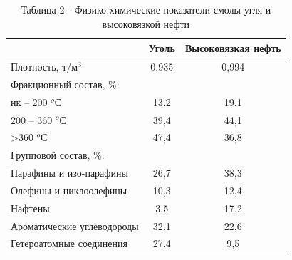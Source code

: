 \begin{table}[H]
\caption*{Таблица 2 - Физико-химические показатели смолы угля и
высоковязкой нефти}
\centering
\begin{tabular}{|l|c|c|}
\hline
                           & \multicolumn{1}{l|}{Уголь} & \multicolumn{1}{l|}{Высоковязкая нефть} \\ \hline
Плотность, т/м$^3$            & 0,935                      & 0,994                                   \\ \hline
Фракционный состав, \%:    & \multicolumn{1}{l|}{}      & \multicolumn{1}{l|}{}                   \\ \hline
нк – 200 $^o$С                & 13,2                       & 19,1                                    \\ \hline
200 – 360 $^o$С               & 39,4                       & 44,1                                    \\ \hline
\textgreater{}360 $^o$С       & 47,4                       & 36,8                                    \\ \hline
Групповой состав, \%:      & \multicolumn{1}{l|}{}      & \multicolumn{1}{l|}{}                   \\ \hline
Парафины и изо-парафины    & 26,7                       & 38,3                                    \\ \hline
Олефины и циклоолефины     & 10,3                       & 12,4                                    \\ \hline
Нафтены                    & 3,5                        & 17,2                                    \\ \hline
Ароматические углеводороды & 32,1                       & 22,6                                    \\ \hline
Гетероатомные соединения   & 27,4                       & 9,5                                     \\ \hline
\end{tabular}
\end{table}

